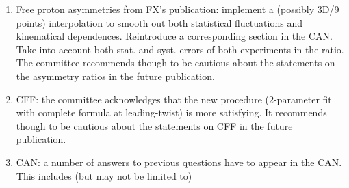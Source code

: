 \begin{enumerate}
\begin{enumerate}
\end{enumerate}

\item Free proton asymmetries from FX's publication: implement a (possibly 3D/9 
points) interpolation to smooth out both statistical fluctuations and 
kinematical dependences. Reintroduce a corresponding section in the CAN. Take 
into account both stat. and syst. errors of both experiments in the ratio. The 
committee recommends though to be cautious about the statements on the 
asymmetry ratios in the future publication.

\item CFF: the committee acknowledges that the new procedure (2-parameter fit 
with complete formula at leading-twist) is more satisfying. It recommends 
though to be cautious about the statements on CFF in the future publication.

\item CAN: a number of answers to previous questions have to appear in the CAN.  
This includes (but may not be limited to) 


\end{enumerate}
